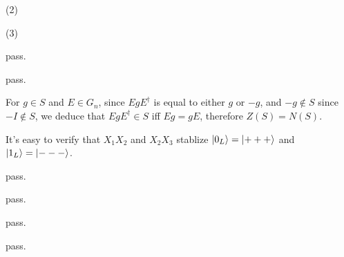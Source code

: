 (2) \todo

(3) \todo

\ex pass.

\ex \todo

\ex pass.

\ex For $g\in S$ and $E\in G_n$, since $EgE^\dagger$ is equal to either $g$ or $-g$, and $-g\notin S$ since $-I \notin S$, we deduce that $EgE^\dagger\in S$ iff $Eg=gE$, therefore $Z(S)=N(S)$.

\ex \todo

\ex It's easy to verify that $X_1X_2$ and $X_2X_3$ stablize $\left|0_L\right\rangle=\left|+++\right\rangle$ and $\left|1_L\right\rangle=\left|---\right\rangle$.

\ex pass.

\ex pass.

\ex 

\ex pass.

\ex 

\ex pass.

\ex 

\ex 

\ex 

\ex 

\ex 

\ex 

\ex 

\ex 

\ex 